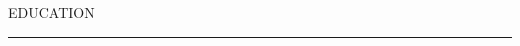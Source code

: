 \documentclass{short_resume} %
\renewenvironment{rSection}[1]{
	\sectionskip
	\textcolor{RoyalPurple}{\MakeUppercase{#1}}
	\sectionlineskip
	\hrule
	\begin{list}{}{
			\setlength{\leftmargin}{1.5em}
		}
		\item[]
	}{
	\end{list}
}
\begin{document}
	
	
	\vspace{-2.5em}
	\begin{rSection}{Education} 


\end{rSection}
\end{document}
